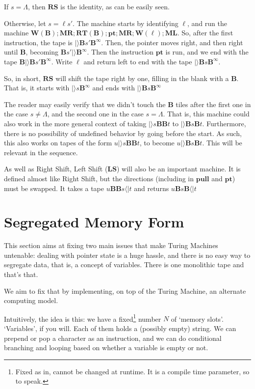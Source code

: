 \documentclass{article}
\newcommand{\B}{\mathbf{B}}
\newcommand{\MR}{\mathbf{MR}}
\newcommand{\ML}{\mathbf{ML}}
\newcommand{\W}{\mathbf{W}}
\newcommand{\RT}{\mathbf{RT}}
\newcommand{\pull}{\mathbf{pull}}
\newcommand{\pt}{\mathbf{pt}}
\newcommand{\RS}{\mathbf{RS}}
\newcommand{\LS}{\mathbf{LS}}
\begin{document}
	If $s = \Lambda$, then $\RS$ is the identity, as can be easily seen.
	
	Otherwise, let $s = \ell s'$. The machine starts by identifying $\ell$, and run the machine $\W(\B); \MR; \RT(\B); \pt; \MR; \W(\ell); \ML$. So, after the first instruction, the tape is $|\rangle \B s' \B^\infty$. Then, the pointer moves right, and then right until $\B$, becoming $\B s' |\rangle \B^\infty$. Then the instruction $\pt$ is run, and we end with the tape $\B |\rangle \B s' \B^\infty$. Write $\ell$ and return left to end with the tape $|\rangle \B s \B^\infty$.
	
	So, in short, $\RS$ will shift the tape right by one, filling in the blank with a $\B$. That is, it starts with $|\rangle s \B^\infty$ and ends with $|\rangle \B s \B^\infty$
	
	The reader may easily verify that we didn't touch the $\B$ tiles after the first one in the case $s \neq \Lambda$, and the second one in the case $s = \Lambda$. That is, this machine could also work in the more general context of taking $|\rangle s \B \B t$ to $|\rangle \B s \B t$. Furthermore, there is no possibility of undefined behavior by going before the start. As such, this also works on tapes of the form $u |\rangle s \B \B t$, to become $u |\rangle \B s \B t$. This will be relevant in the sequence.
	
	As well as Right Shift, Left Shift ($\LS$) will also be an important machine. It is defined almost like Right Shift, but the directions (including in $\pull$ and $\pt$) must be swapped. It takes a tape $u \B \B s \langle| t$ and returns $u \B s \B \langle| t$
	
	\section{Segregated Memory Form}
	
	This section aims at fixing two main issues that make Turing Machines untenable: dealing with pointer state is a huge hassle, and there is no easy way to segregate data, that is, a concept of variables. There is one monolithic tape and that's that.
	
	We aim to fix that by implementing, on top of the Turing Machine, an alternate computing model.
	
	Intuitively, the idea is this: we have a fixed\footnote{Fixed as in, cannot be changed at runtime. It is a compile time parameter, so to speak.} number $N$ of `memory slots'. `Variables', if you will. Each of them holds a (possibly empty) string. We can prepend or pop a character as an instruction, and we can do conditional branching and looping based on whether a variable is empty or not. %
	
\end{document}
